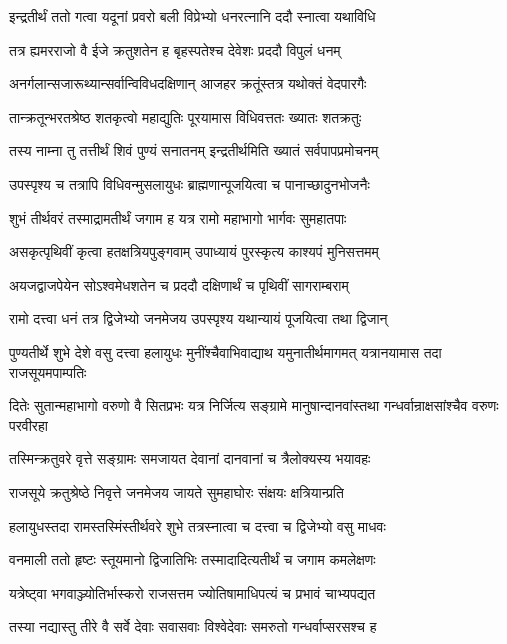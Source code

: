 \twolineshloka
{इन्द्रतीर्थं ततो गत्वा यदूनां प्रवरो बली}
{विप्रेभ्यो धनरत्नानि ददौ स्नात्वा यथाविधि}


\twolineshloka
{तत्र ह्यमरराजो वै ईजे क्रतुशतेन ह}
{बृहस्पतेश्च देवेशः प्रददौ विपुलं धनम्}


\twolineshloka
{अनर्गलान्सजारूथ्यान्सर्वान्विविधदक्षिणान्}
{आजहर क्रतूंस्तत्र यथोक्तं वेदपारगैः}


\twolineshloka
{तान्क्रतून्भरतश्रेष्ठ शतकृत्वो महाद्युतिः}
{पूरयामास विधिवत्ततः ख्यातः शतक्रतुः}


\twolineshloka
{तस्य नाम्ना तु तत्तीर्थं शिवं पुण्यं सनातनम्}
{इन्द्रतीर्थमिति ख्यातं सर्वपापप्रमोचनम्}


\twolineshloka
{उपस्पृश्य च तत्रापि विधिवन्मुसलायुधः}
{ब्राह्मणान्पूजयित्वा च पानाच्छादुनभोजनैः}


\twolineshloka
{शुभं तीर्थवरं तस्माद्रामतीर्थं जगाम ह}
{यत्र रामो महाभागो भार्गवः सुमहातपाः}


\twolineshloka
{असकृत्पृथिवीं कृत्वा हतक्षत्रियपुङ्गवाम्}
{उपाध्यायं पुरस्कृत्य काश्यपं मुनिसत्तमम्}


\twolineshloka
{अयजद्वाजपेयेन सोऽश्वमेधशतेन च}
{प्रददौ दक्षिणार्थं च पृथिवीं सागराम्बराम्}


\twolineshloka
{रामो दत्त्वा धनं तत्र द्विजेभ्यो जनमेजय}
{उपस्पृश्य यथान्यायं पूजयित्वा तथा द्विजान्}


\threelineshloka
{पुण्यतीर्थे शुभे देशे वसु दत्त्वा हलायुधः}
{मुनींश्चैवाभिवाद्याथ यमुनातीर्थमागमत्}
{यत्रानयामास तदा राजसूयमपाम्पतिः}


\threelineshloka
{दितेः सुतान्महाभागो वरुणो वै सितप्रभः}
{यत्र निर्जित्य सङ्ग्रामे मानुषान्दानवांस्तथा}
{गन्धर्वान्राक्षसांश्चैव वरुणः परवीरहा}


\twolineshloka
{तस्मिन्क्रतुवरे वृत्ते सङ्ग्रामः समजायत}
{देवानां दानवानां च त्रैलोक्यस्य भयावहः}


\twolineshloka
{राजसूये क्रतुश्रेष्ठे निवृत्ते जनमेजय}
{जायते सुमहाघोरः संक्षयः क्षत्रियान्प्रति}


\twolineshloka
{हलायुधस्तदा रामस्तस्मिंस्तीर्थवरे शुभे}
{तत्रस्नात्वा च दत्त्वा च द्विजेभ्यो वसु माधवः}


\twolineshloka
{वनमाली ततो हृष्टः स्तूयमानो द्विजातिभिः}
{तस्मादादित्यतीर्थं च जगाम कमलेक्षणः}


\twolineshloka
{यत्रेष्ट्वा भगवाञ्ज्योतिर्भास्करो राजसत्तम}
{ज्योतिषामाधिपत्यं च प्रभावं चाभ्यपद्यत}


\twolineshloka
{तस्या नद्यास्तु तीरे वै सर्वे देवाः सवासवाः}
{विश्वेदेवाः समरुतो गन्धर्वाप्सरसश्च ह}


